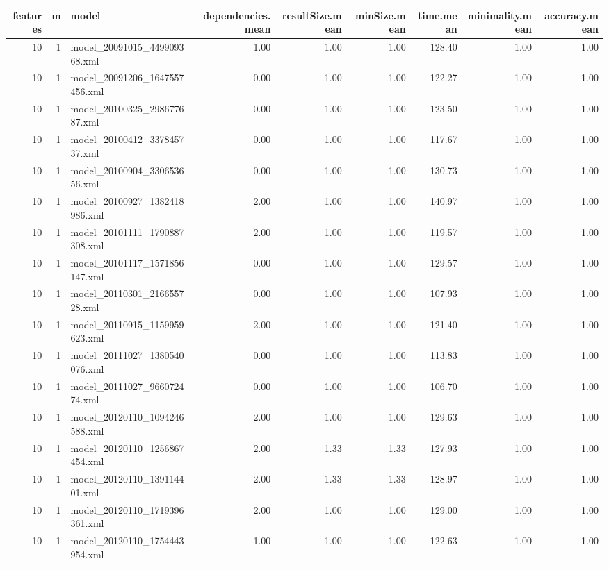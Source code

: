 \begin{table}[ht]
\centering
\begin{tabular}{rrlrrrrrr}
  \hline
features & m & model & dependencies.mean & resultSize.mean & minSize.mean & time.mean & minimality.mean & accuracy.mean \\ 
  \hline
 10 &   1 & model\_20091015\_449909368.xml & 1.00 & 1.00 & 1.00 & 128.40 & 1.00 & 1.00 \\ 
   10 &   1 & model\_20091206\_1647557456.xml & 0.00 & 1.00 & 1.00 & 122.27 & 1.00 & 1.00 \\ 
   10 &   1 & model\_20100325\_298677687.xml & 0.00 & 1.00 & 1.00 & 123.50 & 1.00 & 1.00 \\ 
   10 &   1 & model\_20100412\_337845737.xml & 0.00 & 1.00 & 1.00 & 117.67 & 1.00 & 1.00 \\ 
   10 &   1 & model\_20100904\_330653656.xml & 0.00 & 1.00 & 1.00 & 130.73 & 1.00 & 1.00 \\ 
   10 &   1 & model\_20100927\_1382418986.xml & 2.00 & 1.00 & 1.00 & 140.97 & 1.00 & 1.00 \\ 
   10 &   1 & model\_20101111\_1790887308.xml & 2.00 & 1.00 & 1.00 & 119.57 & 1.00 & 1.00 \\ 
   10 &   1 & model\_20101117\_1571856147.xml & 0.00 & 1.00 & 1.00 & 129.57 & 1.00 & 1.00 \\ 
   10 &   1 & model\_20110301\_216655728.xml & 0.00 & 1.00 & 1.00 & 107.93 & 1.00 & 1.00 \\ 
   10 &   1 & model\_20110915\_1159959623.xml & 2.00 & 1.00 & 1.00 & 121.40 & 1.00 & 1.00 \\ 
   10 &   1 & model\_20111027\_1380540076.xml & 0.00 & 1.00 & 1.00 & 113.83 & 1.00 & 1.00 \\ 
   10 &   1 & model\_20111027\_966072474.xml & 0.00 & 1.00 & 1.00 & 106.70 & 1.00 & 1.00 \\ 
   10 &   1 & model\_20120110\_1094246588.xml & 2.00 & 1.00 & 1.00 & 129.63 & 1.00 & 1.00 \\ 
   10 &   1 & model\_20120110\_1256867454.xml & 2.00 & 1.33 & 1.33 & 127.93 & 1.00 & 1.00 \\ 
   10 &   1 & model\_20120110\_139114401.xml & 2.00 & 1.33 & 1.33 & 128.97 & 1.00 & 1.00 \\ 
   10 &   1 & model\_20120110\_1719396361.xml & 2.00 & 1.00 & 1.00 & 129.00 & 1.00 & 1.00 \\ 
   10 &   1 & model\_20120110\_1754443954.xml & 1.00 & 1.00 & 1.00 & 122.63 & 1.00 & 1.00 \\ 

\end{tabular}
\end{table}
